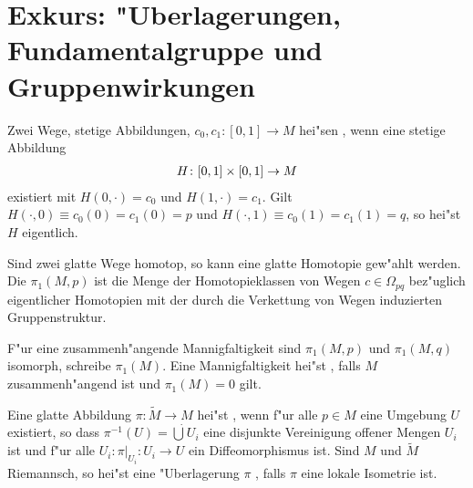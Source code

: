 \section{Exkurs: "Uberlagerungen, Fundamentalgruppe und Gruppenwirkungen}

\begin{emptythm}[Erinnerung]
  Zwei Wege, stetige Abbildungen, $c_0,c_1 \colon[0,1] \to M$ hei"sen , wenn eine stetige Abbildung
  \begin{align*}
    H \colon [0,1]\times[0,1] \to M
  \end{align*}
  existiert mit $H(0,\cdot) = c_0$ und $H(1,\cdot) = c_1$.
  Gilt $H(\cdot, 0) \equiv c_0(0) = c_1(0) = p$ und $H(\cdot,1) \equiv c_0(1) = c_1(1) = q$, so hei"st $H$ eigentlich.
\end{emptythm}

\begin{bem}
  Sind zwei glatte Wege homotop, so kann eine glatte Homotopie gew"ahlt werden.
  Die  $\pi_1(M,p)$ ist die Menge der Homotopieklassen von Wegen $c \in \Omega_{pq}$ bez"uglich eigentlicher Homotopien mit der durch die Verkettung von Wegen induzierten Gruppenstruktur.
  \begin{center}	\end{center}
  F"ur eine zusammenh"angende Mannigfaltigkeit sind $\pi_1(M,p)$ und $\pi_1(M,q)$ isomorph, schreibe $\pi_1(M)$.
  Eine Mannigfaltigkeit hei"st , falls $M$ zusammenh"angend ist und $\pi_1(M) = 0$ gilt.
\end{bem}

Eine glatte Abbildung $\pi: \tilde M \to M$ hei"st , wenn f"ur alle $p \in M$ eine Umgebung $U$ existiert, so dass $\pi^{-1}(U) = \dot \bigcup U_i$ eine disjunkte Vereinigung offener Mengen $U_i$ ist und f"ur alle $U_i: \pi|_{U_i}: U_i \to U$ ein Diffeomorphismus ist.
Sind $M$ und $\tilde M$ Riemannsch, so hei"st eine "Uberlagerung $\pi$ , falls $\pi$ eine lokale Isometrie ist.

